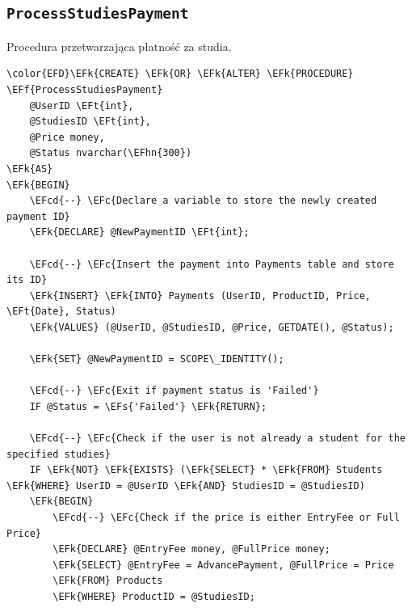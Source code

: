 \documentclass[11pt]{article}
\newcommand{\EFc}[1]{\textcolor{EFc}{\textit{#1}}} %
\newcommand{\EFcd}[1]{\textcolor{EFcd}{\textit{#1}}} %
\newcommand{\EFs}[1]{\textcolor{EFs}{#1}} %
\newcommand{\EFk}[1]{\textcolor{EFk}{\textbf{#1}}} %
\newcommand{\EFf}[1]{\textcolor{EFf}{#1}} %
\newcommand{\EFt}[1]{\textcolor{EFt}{\textbf{#1}}} %
\newcommand{\EFhn}[1]{\textcolor{EFhn}{#1}} %
\begin{document}
\subsection{\texttt{ProcessStudiesPayment}}
\label{sec:org8ff1a15}
Procedura przetwarzająca płatność za studia.
\begin{Code}
\begin{Verbatim}
\color{EFD}\EFk{CREATE} \EFk{OR} \EFk{ALTER} \EFk{PROCEDURE} \EFf{ProcessStudiesPayment}
    @UserID \EFt{int},
    @StudiesID \EFt{int},
    @Price money,
    @Status nvarchar(\EFhn{300})
\EFk{AS}
\EFk{BEGIN}
    \EFcd{--} \EFc{Declare a variable to store the newly created payment ID}
    \EFk{DECLARE} @NewPaymentID \EFt{int};

    \EFcd{--} \EFc{Insert the payment into Payments table and store its ID}
    \EFk{INSERT} \EFk{INTO} Payments (UserID, ProductID, Price, \EFt{Date}, Status)
    \EFk{VALUES} (@UserID, @StudiesID, @Price, GETDATE(), @Status);

    \EFk{SET} @NewPaymentID = SCOPE\_IDENTITY();

    \EFcd{--} \EFc{Exit if payment status is 'Failed'}
    IF @Status = \EFs{'Failed'} \EFk{RETURN};

    \EFcd{--} \EFc{Check if the user is not already a student for the specified studies}
    IF \EFk{NOT} \EFk{EXISTS} (\EFk{SELECT} * \EFk{FROM} Students \EFk{WHERE} UserID = @UserID \EFk{AND} StudiesID = @StudiesID)
    \EFk{BEGIN}
        \EFcd{--} \EFc{Check if the price is either EntryFee or Full Price}
        \EFk{DECLARE} @EntryFee money, @FullPrice money;
        \EFk{SELECT} @EntryFee = AdvancePayment, @FullPrice = Price 
        \EFk{FROM} Products 
        \EFk{WHERE} ProductID = @StudiesID;


\end{Verbatim}
\end{Code}
\end{document}
